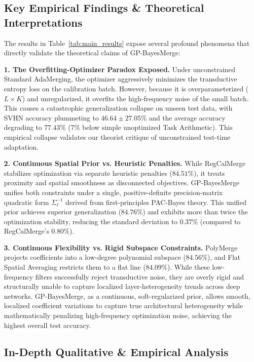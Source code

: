 \subsection{Key Empirical Findings \& Theoretical Interpretations}

The results in Table~\ref{tab:main_results} expose several profound phenomena
that directly validate the theoretical claims of GP-BayesMerge:

\textbf{1. The Overfitting-Optimizer Paradox Exposed.} Under unconstrained
Standard AdaMerging, the optimizer aggressively minimizes the transductive
entropy loss on the calibration batch. However, because it is overparameterized
($L \times K$) and unregularized, it overfits the high-frequency noise of the
small batch. This causes a catastrophic generalization collapse on unseen test
data, with SVHN accuracy plummeting to $46.64 \pm 27.05\%$ and the average
accuracy degrading to $77.43\%$ (7\% below simple unoptimized Task Arithmetic).
This empirical collapse validates our theorist critique of unconstrained
test-time adaptation.

\textbf{2. Continuous Spatial Prior vs. Heuristic Penalties.} While RegCalMerge
stabilizes optimization via separate heuristic penalties ($84.51\%$), it treats
proximity and spatial smoothness as disconnected objectives. GP-BayesMerge
unifies both constraints under a single, positive-definite precision-matrix
quadratic form $\Sigma_{\ell}^{-1}$ derived from first-principles PAC-Bayes
theory. This unified prior achieves superior generalization ($84.76\%$) and
exhibits more than twice the optimization stability, reducing the standard
deviation to $0.37\%$ (compared to RegCalMerge's $0.80\%$).

\textbf{3. Continuous Flexibility vs. Rigid Subspace Constraints.} PolyMerge
projects coefficients into a low-degree polynomial subspace ($84.56\%$), and
Flat Spatial Averaging restricts them to a flat line ($84.09\%$). While these
low-frequency filters successfully reject transductive noise, they are overly
rigid and structurally unable to capture localized layer-heterogeneity trends
across deep networks. GP-BayesMerge, as a continuous, soft-regularized prior,
allows smooth, localized coefficient variations to capture true architectural
heterogeneity while mathematically penalizing high-frequency optimization noise,
achieving the highest overall test accuracy.

\subsection{In-Depth Qualitative \& Empirical Analysis}

